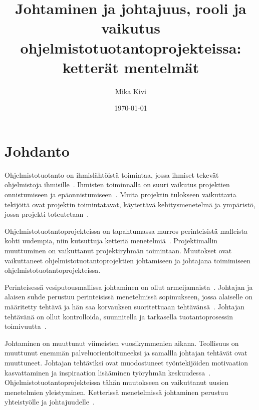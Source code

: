 \documentclass[finnish]{tktltiki2}
\title{Johtaminen ja johtajuus, rooli ja vaikutus ohjelmistotuotantoprojekteissa: ketterät mentelmät}
\author{Mika Kivi}
\date{\today}
\theoremstyle{definition}
\theoremstyle{remark}
\begin{document}

\maketitle        %
\makeabstract     %

\tableofcontents  %
\newpage          %



\section{Johdanto}


Ohjelmistotuotanto on ihmislähtöistä toimintaa, jossa ihmiset tekevät ohjelmistoja ihmisille~\cite{Wang:2010:PPP:1810295.1810302}. Ihmisten toiminnalla on suuri vaikutus projektien onnistumiseen ja epäonnistumiseen~\cite{Wang:2009:PMP:1639950.1640049}. Muita projektin tulokseen vaikuttavia tekijöitä ovat projektin toimintatavat, käytettävä kehitysmenetelmä ja ympäristö, jossa projekti toteutetaan~\cite{McLeod:2011:FAS:1978802.1978803}.

Ohjelmistotuotantoprojekteissa on tapahtumassa murros perinteisistä malleista kohti uudempia, niin kutsuttuja ketteriä menetelmiä~\cite{Chow2008961}.  Projektimallin muuttuminen on vaikuttanut projektiryhmän toimintaan. Muutokset ovat vaikuttaneet ohjelmistotuotantoprojektien johtamiseen ja johtajana toimimiseen ohjelmistotuotantoprojekteissa.

Perinteisessä vesiputousmallissa johtaminen on ollut armeijamaista~\cite{Nerur:2005:CMA:1060710.1060712}. Johtajan ja alaisen suhde perustuu perinteisissä menetelmissä sopimukseen, jossa alaiselle on määritetty tehtävä ja hän saa korvauksen suoritettuaan tehtävänsä~\cite{thite2000leadership}. Johtajan tehtävänä on ollut kontrolloida, suunnitella ja tarkasella tuotantoprosessin toimivuutta~\cite{palmer2001emotional}. 

Johtaminen on muuttunut viimeisten vuosikymmenien aikana. Teollisuus on muuttunut enemmän palveluorientoituneeksi ja samallla johtajan tehtävät ovat muuttuneet. Johtajan tehtäviksi ovat muodostuneet työntekijöiden motivaation kasvattaminen ja inspiraation lisääminen työryhmän keskuudessa~\cite{palmer2001emotional}.  Ohjelmistotuotantoprojekteissa tähän muutokseen on vaikuttanut uusien menetelmien yleistyminen. Ketterissä menetelmissä johtaminen perustuu yhteistyölle ja johtajuudelle~\cite{Nerur:2005:CMA:1060710.1060712}. 
\end{document}
